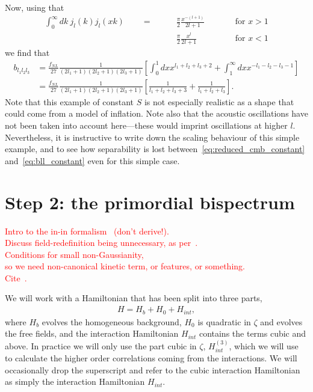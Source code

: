     Now, using that
    \begin{align}
        \int_0^\infty dk~j_l(k)j_l(xk)\qquad=\qquad&\frac{\pi}{2}\frac{x^{-(l+1)}}{2l+1}\qquad&&\text{for $x>1$}\\
                            \qquad&\frac{\pi}{2}\frac{x^{l}}{2l+1}\qquad&&\text{for $x<1$}
    \end{align}
    we find that
    \begin{align}
    \label{eq:bll_constant}
        b_{l_1l_2l_3} &= \frac{f_{NL}}{27}\frac{1}{(2l_1+1)(2l_2+1)(2l_3+1)}
        \left[\int^1_0dx x^{l_1+l_2+l_3+2}+\int^\infty_1dx x^{-l_1-l_2-l_3-1}\right]\\
                &= \frac{f_{NL}}{27}\frac{1}{(2l_1+1)(2l_2+1)(2l_3+1)}
        \left[\frac{1}{l_1+l_2+l_3+3}+\frac{1}{l_1+l_2+l_3}\right].
    \end{align}
    Note that this example of constant $S$ is not especially realistic as a shape that could
    come from a model of inflation. Note also that the acoustic oscillations have not been taken
    into account here---these would imprint oscillations at higher $l$.
    Nevertheless, it is instructive to write down the scaling behaviour of this
    simple example, and to see how separability is lost between~\eqref{eq:reduced_cmb_constant}
    and~\eqref{eq:bll_constant} even for this simple case.


    \section{Step 2: the primordial bispectrum}\label{sec:inin_calc_example}
    \textcolor{red}{Intro to the
    in-in formalism~\cite{Baumann_tasi} (don't derive!).\\
    Discuss field-redefinition being unnecessary, as per~\cite{px_burrage}.\\
    Conditions for small non-Gaussianity,\\
    so we need non-canonical kinetic term, or features, or something.\\
    Cite~\cite{Bartolo_review_2004, Chen_review_2010, Babich_2004, Baumann_horizon_2011,
    Renaux-Petel_2015, Meerburg_clock}.}


    We will work with a Hamiltonian that has been split into three parts,
    \begin{align}
        H = H_b + H_0 + H_{int},
    \end{align}
    where $H_b$ evolves the homogeneous background, $H_0$ is quadratic in $\zeta$ and evolves the free
    fields, and the interaction Hamiltonian $H_{int}$ contains the terms cubic and above.
    In practice we will only use the part cubic in $\zeta$, $H_{int}^{(3)}$, which we will use to calculate
    the higher order correlations coming from the interactions. We will occasionally drop the superscript and
    refer to the cubic interaction Hamiltonian as simply the interaction Hamiltonian $H_{int}$.


